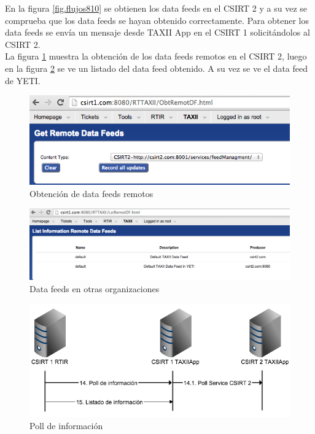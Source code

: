 En la figura \ref{fig.flujos810} se obtienen los data feeds en el CSIRT 2 y a su vez se comprueba que los data feeds se hayan obtenido correctamente. Para obtener los data feeds se envía un mensaje desde TAXII App en el CSIRT 1 solicitándolos al CSIRT 2. \\
La figura \ref{fig.obtremote} muestra la obtención de los data feeds remotos en el CSIRT 2, luego en la figura \ref{fig.lstremotedf} se ve un listado del data feed obtenido. A su vez se ve el data feed de YETI.

\begin{figure}[H]
	\centering
	\includegraphics[scale=0.5]{caso-de-estudio/obtremote.png}
	\caption{Obtención de data feeds remotos}
	\label{fig.obtremote}
\end{figure}

\begin{figure}[H]
	\centering
	\includegraphics[scale=0.4]{caso-de-estudio/lstremotedf.png}
	\caption{Data feeds en otras organizaciones}
	\label{fig.lstremotedf}
\end{figure}

\begin{figure}[H]
	\centering
	\includegraphics[scale=0.6]{flujos/flujo15-15.png}
	\caption{Poll de información}
	\label{fig.flujos1415}
\end{figure}

